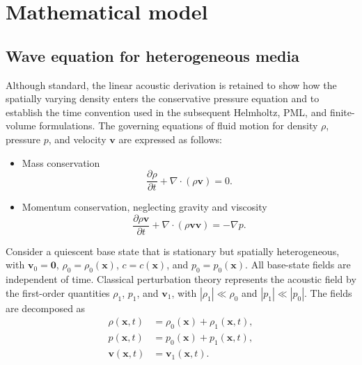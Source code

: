 \documentclass[final,12pt,nopreprintline,longtitle]{elsarticle}
\renewcommand{\v}{\mathbf{v}}
\newcommand{\x}{\mathbf{x}}
\begin{document}
\section{Mathematical model}
\label{sec:model}

\subsection{Wave equation for heterogeneous media}
Although standard, the linear acoustic derivation is retained to show how the
spatially varying density enters the conservative pressure equation and to
establish the time convention used in the subsequent Helmholtz, PML, and
finite-volume formulations.
The governing equations of fluid motion for density $\rho$, pressure $p$, and velocity $\v$ are expressed as follows:
\begin{itemize}
\item Mass conservation
        \begin{equation}
            \frac{\partial \rho}{\partial t} + \nabla\cdot(\rho \v)=0.
            \label{eq:massConserv}
        \end{equation}
        \item Momentum conservation, neglecting gravity and viscosity
        \begin{equation}
            \frac{\partial \rho \v}{\partial t} + \nabla\cdot(\rho \v\v)=-\nabla p.
            \label{eq:momConserv}    
        \end{equation}
\end{itemize}  
   
\begin{samepage}
Consider a quiescent base state that is stationary but spatially heterogeneous,
with $\v_0=\mathbf{0}$, $\rho_0=\rho_0(\x)$,
$c=c(\x)$, and $p_0=p_0(\x)$.  All base-state fields are independent of time.
Classical perturbation theory represents the acoustic field by the first-order
quantities $\rho_1$, $p_1$, and $\v_1$, with
$|\rho_1|\ll\rho_0$ and $|p_1|\ll|p_0|$.  The fields are decomposed as
    \begin{equation}
        \begin{aligned}
            \rho(\x,t) &= \rho_0(\x) + \rho_1(\x,t), \\
            p(\x,t) &= p_0(\x) + p_1(\x,t), \\
            \v(\x,t) &= \v_1(\x,t).
            \label{eq:1stPert}
        \end{aligned}
    \end{equation}
\end{samepage}
\end{document}
